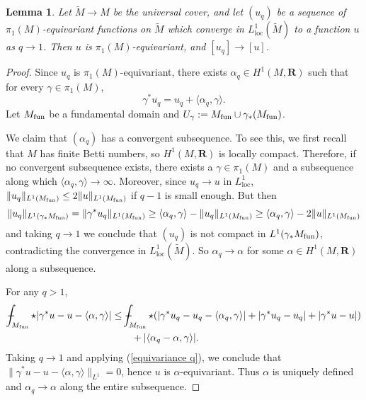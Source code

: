 \documentclass[reqno,11pt]{amsart}
\newcommand{\RR}{\mathbf{R}}
\newcommand{\loc}{\mathrm{loc}}
\newtheorem{lemma}[theorem]{Lemma}
\theoremstyle{definition}
\numberwithin{equation}{section}
\def\Xint#1{\mathchoice
{\XXint\displaystyle\textstyle{#1}}%
{\XXint\textstyle\scriptstyle{#1}}%
{\XXint\scriptstyle\scriptscriptstyle{#1}}%
{\XXint\scriptscriptstyle\scriptscriptstyle{#1}}%
\!\int}
\def\XXint#1#2#3{{\setbox0=\hbox{$#1{#2#3}{\int}$ }
\vcenter{\hbox{$#2#3$ }}\kern-.6\wd0}}
\def\dashint{\Xint-}
\begin{document}
\begin{lemma}\label{L1 convergence preserves pi1}
Let $\tilde M \to M$ be the universal cover, and let $(u_q)$ be a sequence of $\pi_1(M)$-equivariant functions on $\tilde M$ which converge in $L^1_\loc(\tilde M)$ to a function $u$ as $q \to 1$.
Then $u$ is $\pi_1(M)$-equivariant, and $[u_q] \to [u]$.
\end{lemma}
\begin{proof}
Since $u_q$ is $\pi_1(M)$-equivariant, there exists $\alpha_q \in H^1(M, \RR)$ such that for every $\gamma \in \pi_1(M)$,
\begin{equation}\label{equivariance q}
	\gamma^* u_q = u_q + \langle \alpha_q, \gamma\rangle.
\end{equation}
Let $M_{\rm fun}$ be a fundamental domain and $U_\gamma := M_{\rm fun} \cup \gamma_* (M_{\rm fun})$.

We claim that $(\alpha_q)$ has a convergent subsequence.
To see this, we first recall that $M$ has finite Betti numbers, so $H^1(M, \RR)$ is locally compact.
Therefore, if no convergent subsequence exists, there exists a $\gamma \in \pi_1(M)$ and a subsequence along which $\langle \alpha_q, \gamma\rangle \to \infty$.
Moreover, since $u_q \to u$ in $L^1_\loc$, $\|u_q\|_{L^1(M_{\rm fun})} \leq 2\|u\|_{L^1(M_{\rm fun})}$ if $q - 1$ is small enough.
But then 
$$\|u_q\|_{L^1(\gamma_* M_{\rm fun})} = \|\gamma^* u_q\|_{L^1(M_{\rm fun})} \geq \langle \alpha_q, \gamma\rangle - \|u_q\|_{L^1(M_{\rm fun})} \geq \langle \alpha_q, \gamma\rangle - 2\|u\|_{L^1(M_{\rm fun})}$$
and taking $q \to 1$ we conclude that $(u_q)$ is not compact in $L^1(\gamma_* M_{\rm fun})$, contradicting the convergence in $L^1_\loc(\tilde M)$.
So $\alpha_q \to \alpha$ for some $\alpha \in H^1(M, \RR)$ along a subsequence.

For any $q > 1$,
\begin{align*}
\dashint_{M_{\rm fun}} \star |\gamma^* u - u - \langle \alpha, \gamma\rangle| 
&\leq \dashint_{M_{\rm fun}} \star (|\gamma^* u_q - u_q - \langle \alpha_q, \gamma\rangle| + |\gamma^* u_q - u_q| + |\gamma^* u - u|) \\
&\qquad + |\langle \alpha_q - \alpha, \gamma\rangle|.
\end{align*}
Taking $q \to 1$ and applying (\ref{equivariance q}), we conclude that $\|\gamma^* u - u - \langle \alpha, \gamma\rangle\|_{L^1} = 0$, hence $u$ is $\alpha$-equivariant.
Thus $\alpha$ is uniquely defined and $\alpha_q \to \alpha$ along the entire subsequence.
\end{proof}
\end{document}
